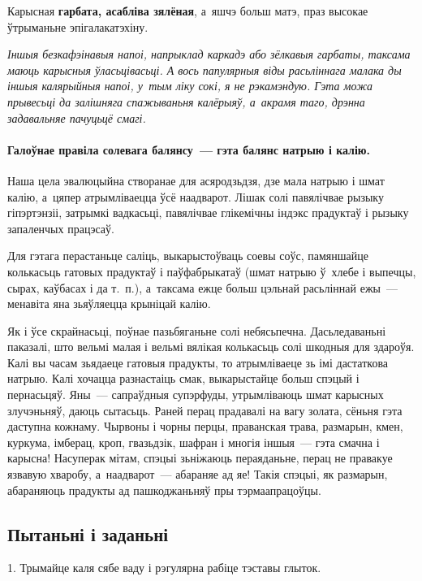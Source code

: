Карысная \textbf{гарбата, асабліва зялёная}, а~яшчэ больш матэ, праз высокае ўтрыманьне эпігалакатэхіну. 

\emph{Іншыя безкафэінавыя напоі, напрыклад каркадэ або зёлкавыя гарбаты, таксама маюць карысныя ўласьцівасьці. А вось папулярныя віды расьліннага малака ды іншыя калярыйныя напоі, у~тым ліку сокі, я не рэкамэндую. Гэта можа прывесьці да залішняга спажываньня калёрыяў, а~акрамя таго, дрэнна задавальняе пачуцьцё смагі.}

\paragraph{Галоўнае правіла солевага балянсу~--- гэта балянс натрыю і калію.} Наша цела эвалюцыйна створанае для асяродзьдзя, дзе мала натрыю і шмат калію, а~цяпер атрымліваецца ўсё наадварот. Лішак солі павялічвае рызыку гіпэртэнзіі, затрымкі вадкасьці, павялічвае глікемічны індэкс прадуктаў і рызыку запаленчых працэсаў. 


Для гэтага перастаньце саліць, выкарыстоўваць соевы соўс, памяншайце колькасьць гатовых прадуктаў і паўфабрыкатаў (шмат натрыю ў~хлебе і выпечцы, сырах, каўбасах і да т.~п.), а~таксама ежце больш цэльнай расьліннай ежы~--- менавіта яна зьяўляецца крыніцай калію.

Як і ўсе скрайнасьці, поўнае пазьбяганьне солі небясьпечна. Дасьледаваньні паказалі, што вельмі малая і вельмі вялікая колькасьць солі шкодныя для здароўя. Калі вы часам зьядаеце гатовыя прадукты, то атрымліваеце зь імі дастаткова натрыю. Калі хочацца разнастаіць смак, выкарыстайце больш спэцый і пернасьцяў. Яны~--- сапраўдныя супэрфуды, утрымліваюць шмат карысных злучэньняў, даюць сытасьць. Раней перац прадавалі на вагу золата, сёньня гэта даступна кожнаму. Чырвоны і чорны перцы, праванская трава, размарын, кмен, куркума, імберац, кроп, гвазьдзік, шафран і многія іншыя~--- гэта смачна і карысна! Насуперак мітам, спэцыі зьніжаюць пераяданьне, перац не правакуе язвавую хваробу, а~наадварот~--- абараняе ад яе! Такія спэцыі, як размарын, абараняюць прадукты ад пашкоджаньняў пры тэрмаапрацоўцы.

\subsection*{Пытаньні і заданьні}

1. Трымайце каля сябе ваду і рэгулярна рабіце тэставы глыток.

